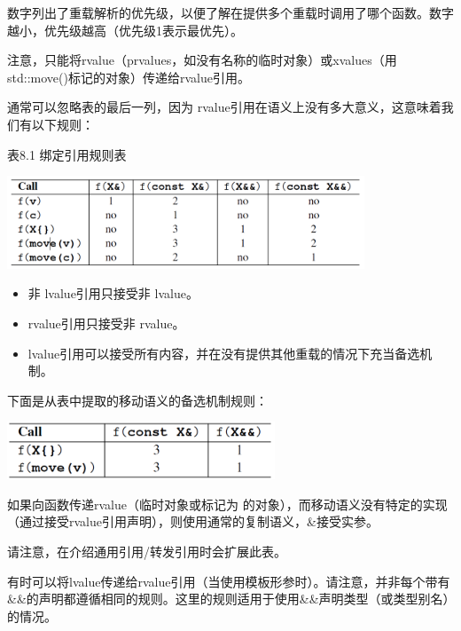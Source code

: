 数字列出了重载解析的优先级，以便了解在提供多个重载时调用了哪个函数。数字越小，优先级越高（优先级1表示最优先）。

注意，只能将rvalue（prvalues，如没有名称的临时对象）或xvalues（用std::move()标记的对象）传递给rvalue引用。

通常可以忽略表的最后一列，因为  rvalue引用在语义上没有多大意义，这意味着我们有以下规则：

\hspace*{\fill}  %
表8.1 绑定引用规则表

\begin{center}
	\includegraphics[width=0.8\textwidth]{part1/ch8/images/3}
\end{center}

\begin{itemize}
	\item 非  lvalue引用只接受非  lvalue。
	\item rvalue引用只接受非  rvalue。
	\item {} lvalue引用可以接受所有内容，并在没有提供其他重载的情况下充当备选机制。
\end{itemize}

下面是从表中提取的移动语义的备选机制规则：

\begin{center}
	\includegraphics[width=0.6\textwidth]{part1/ch8/images/4}
\end{center}

如果向函数传递rvalue（临时对象或标记为  的对象），而移动语义没有特定的实现（通过接受rvalue引用声明），则使用通常的复制语义，\&接受实参。

请注意，在介绍通用引用/转发引用时会扩展此表。

有时可以将lvalue传递给rvalue引用（当使用模板形参时）。请注意，并非每个带有\&\&的声明都遵循相同的规则。这里的规则适用于使用\&\&声明类型（或类型别名）的情况。

